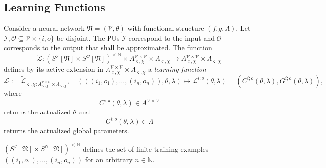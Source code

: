 \documentclass[a4paper,11pt]{report}
\newcommand{\const}{\varsigma} %
\newcommand{\var}{\chi} %
\begin{document}
\subsection{Learning Functions}\label{subsec:theory-learning-intro}

\begin{Def}
Consider a neural network $\mathfrak{N}=(\mathcal{V},\theta)$ with functional structure $(f,g,\Lambda)$. Let $\mathcal{I},\mathcal{O}\subseteq\mathcal{V}\times\{i,o\}$ be disjoint. The PUs $\mathcal{I}$ correspond to the input and $\mathcal{O}$ corresponds to the output that shall be approximated. The function
\[
\tilde{\mathcal{L}}:\left(S^{\mathcal{I}}[\mathfrak{N}]\times S^{\mathcal{O}}[\mathfrak{N}]\right)^{<\mathbb{N}}\times A^{\mathcal{V}\times\mathcal{V}}_{\const,\var}\times\Lambda_{\const,\var}\to A^{\mathcal{V}\times\mathcal{V}}_{\const,\var}\times\Lambda_{\const,\var}
\]
defines by its active extension in $A^{\mathcal{V}\times\mathcal{V}}_{\const,\var}\times\Lambda_{\const,\var}$ a \emph{learning function}
\[
\mathcal{L}:=\tilde{\mathcal{L}}_{\const,\var:A^{\mathcal{V}\times\mathcal{V}}_{\const,\var}\times\Lambda_{\const,\var}},
\quad
(\left((i_1,o_1),\dotsc,(i_n,o_n)\right),\theta,\lambda)\mapsto \mathcal{L}^{i;o}(\theta,\lambda)=(C^{i;o}(\theta,\lambda),G^{i;o}(\theta,\lambda)),
\]
where
\[
C^{i;o}(\theta,\lambda)\in A^{\mathcal{V}\times\mathcal{V}}
\]
returns the actualized $\theta$ and
\[
G^{i;o}(\theta,\lambda)\in\Lambda
\]
returns the actualized global parameters.
\end{Def}

\begin{Rem}
$\left(S^{\mathcal{I}}[\mathfrak{N}]\times S^{\mathcal{O}}[\mathfrak{N}]\right)^{<\mathbb{N}}$ defines the set of finite training examples $\left((i_1,o_1),\dotsc,(i_n,o_n)\right)$ for an arbitrary $n\in\mathbb{N}$.
\end{Rem}
\end{document}
